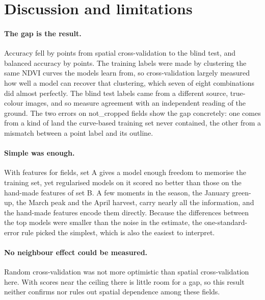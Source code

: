 \documentclass[10pt]{article}
\begin{document}
\section{Discussion and limitations}

\paragraph{The gap is the result.} Accuracy fell by \GapAcc{} points from spatial cross-validation to
the blind test, and balanced accuracy by \GapBal{} points. The training labels were made by clustering
the same NDVI curves the models learn from, so cross-validation largely measured how well a model can
recover that clustering, which seven of eight combinations did almost perfectly. The blind test labels
came from a different source, true-colour images, and so measure agreement with an independent reading
of the ground. The two errors on not\_cropped fields show the gap concretely: one comes from a kind of
land the curve-based training set never contained, the other from a mismatch between a point label and
its outline.

\paragraph{Simple was enough.} With \NFeatA{} features for \NTrain{} fields, set A gives a model enough
freedom to memorise the training set, yet regularised models on it scored no better than those on the
\NFeatB{} hand-made features of set B. A few moments in the season, the January green-up, the March
peak and the April harvest, carry nearly all the information, and the hand-made features encode them
directly. Because the differences between the top models were smaller than the noise in the estimate,
the one-standard-error rule picked the simplest, which is also the easiest to interpret.

\paragraph{No neighbour effect could be measured.} Random cross-validation was not more optimistic than
spatial cross-validation here. With scores near the ceiling there is little room for a gap, so this
result neither confirms nor rules out spatial dependence among these fields.
\end{document}
